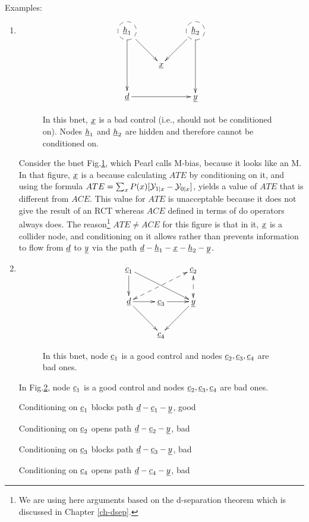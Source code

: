 Examples:

\begin{enumerate}
\item
\begin{figure}[h!]
$$
\xymatrix{
*++[F-o]{\rvh_1} \ar[dd]\ar[dr]
&
& *++[F-o]{\rvh_2}  \ar[dd]\ar[dl]
\\
& \rvx
\\
\rvd \ar[rr]
&&\rvy
}$$
\caption{In this bnet,
$\rvx$ is a bad control
(i.e., should
not be conditioned on).
Nodes $\rvh_1$
and $\rvh_2$ are
hidden and therefore
cannot be conditioned on.}
\label{fig-po-m-bias}
\end{figure}

Consider the
bnet Fig.\ref{fig-po-m-bias},
which  Pearl calls M-bias,
because it looks like an M.
In that figure,
$\rvx$
is a 
because
calculating
$ATE$ by conditioning on it,
and using the formula
$ATE=\sum_x
 P(x)[{\cal Y}_{1|x}-{\cal Y}_{0|x}]$,
yields a value of $ATE$
that is different from
$ACE$. This value for $ATE$
is unacceptable
because it does
not give the result of an RCT
whereas $ACE$ defined
in terms of do operators
always does.
The reason\footnote{We are
using here arguments
based on the d-separation
theorem
which is discussed in Chapter
\ref{ch-dsep}.} $ATE\neq ACE$
for this figure
is that in it,
$\rvx$ is
a collider node,
and conditioning
on it allows
rather than
prevents information
to flow from $\rvd$
to $\rvy$
via the path
$\rvd-\rvh_1-\rvx-\rvh_2-\rvy$.
\item

\begin{figure}[h!]
$$
\xymatrix{
\rvc_1\ar[d]\ar[drr]
&&\rvc_2\ar@{<-->}[d]
\ar@{<-->}[dll]
\\
\rvd\ar[r]\ar[dr]
&\rvc_3\ar[r]
&\rvy\ar[dl]
\\
&\rvc_4
}$$
\caption{In this bnet,
node $\rvc_1$ is a good
control and nodes $\rvc_2, \rvc_3, \rvc_4$
are bad ones.}
\label{fig-po-1-good-3-bad}
\end{figure}

In Fig.\ref{fig-po-1-good-3-bad}, node
$\rvc_1$ is a good
control and nodes $\rvc_2, \rvc_3, \rvc_4$
are bad ones.

Conditioning on $\rvc_1$ blocks path $\rvd-\rvc_1-\rvy$, good

Conditioning on $\rvc_2$ opens path $\rvd-\rvc_2-\rvy$, bad

Conditioning on $\rvc_3$ blocks path $\rvd-\rvc_3-\rvy$, bad

Conditioning on $\rvc_4$ opens path $\rvd-\rvc_4-\rvy$, bad



\end{enumerate}

